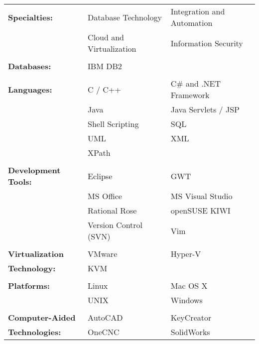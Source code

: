 \documentclass[margin,line]{resume}
\begin{document}
\begin{resume}
\begin{tabular}{@{}p{1.75in}p{1.75in}p{1.75in}}
\textbf{Specialties:}			&	Database Technology		&	Integration and Automation	\\
					&	Cloud and Virtualization	&	Information Security		\\
\\
\textbf{Databases:}			&	IBM DB2				&					\\
\\
\textbf{Languages:}			&	C / C++				&	C\# and .NET Framework		\\
					&	Java				&	Java Servlets / JSP		\\
					&	Shell Scripting			&	SQL				\\
					&	UML				&	XML				\\
					&	XPath				&					\\
\\
\textbf{Development Tools:}		&	Eclipse				&	GWT				\\
					&	MS Office			&	MS Visual Studio		\\
					&	Rational Rose			&	openSUSE KIWI			\\
					&	Version Control (SVN)		&	Vim				\\
\\
\textbf{Virtualization }		&	VMware				&	Hyper-V				\\
\textbf{Technology:}			&	KVM				&					\\
\\
\textbf{Platforms:}			&	Linux				&	Mac OS X			\\
					&	UNIX				&	Windows				\\
\\
\textbf{Computer-Aided }		&	AutoCAD				&	KeyCreator			\\
\textbf{Technologies:}			&	OneCNC				&	SolidWorks			\\
\end{tabular}



\end{resume}
\end{document}
